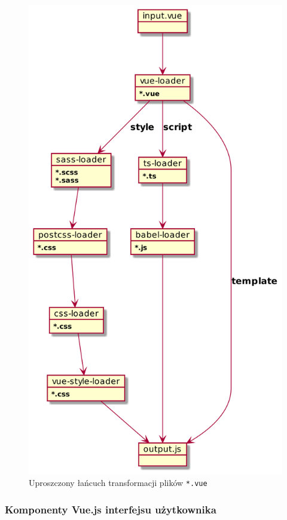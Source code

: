 \begin{figure}
    \centering
    \includegraphics[scale=0.3]{diagrams/out/c3_webpack.png}
    \caption{Uproszczony łańcuch transformacji plików \texttt{*.vue}}
    \label{fig:c3_webpack}
\end{figure}

\subsubsection{Komponenty Vue.js interfejsu użytkownika}

